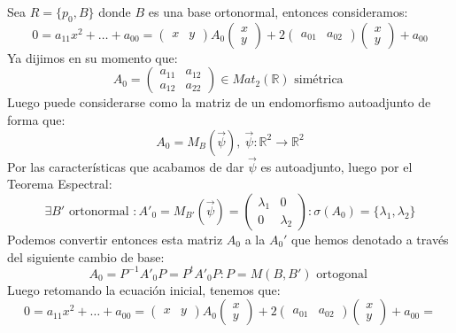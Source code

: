 \documentclass[10pt,a4paper,openright]{book}
\begin{document}
Sea $R = \{p_0, B\}$ donde $B$ es una base ortonormal, entonces consideramos:
$$0 = a_{11}x^2 + \ldots + a_{00} = \begin{pmatrix} x & y \end{pmatrix} A_0 \begin{pmatrix} x \\ y \end{pmatrix} + 2 \begin{pmatrix} a_{01} & a_{02} \end{pmatrix} \begin{pmatrix} x \\ y \end{pmatrix} + a_{00}$$
Ya dijimos en su momento que:
$$A_0 = \begin{pmatrix}
a_{11} & a_{12} \\ a_{12} & a_{22}
\end{pmatrix} \in Mat_2 (\mathbb{R}) \mbox{ simétrica }$$
Luego puede considerarse como la matriz de un endomorfismo autoadjunto de forma que:
$$A_0 = M_B (\vec{\psi}), \ \vec{\psi} : \mathbb{R}^2 \to \mathbb{R}^2$$
Por las características que acabamos de dar $\vec{\psi}$ es autoadjunto, luego por el Teorema Espectral:
$$\exists B' \mbox{ ortonormal }: A'_0 = M_{B'} (\vec{\psi}) = \begin{pmatrix} \lambda_1 & 0 \\ 0 & \lambda_2 \end{pmatrix}:  \sigma(A_0) = \{\lambda_1, \lambda_2\}$$
Podemos convertir entonces esta matriz $A_0$ a la $A_0'$ que hemos denotado a través del siguiente cambio de base:
$$A_0 = P^{-1} A'_0 P = P^t A'_0 P : P = M(B, B') \mbox{ ortogonal }$$
Luego retomando la ecuación inicial, tenemos que:
$$0 = a_{11}x^2 + \ldots + a_{00} = \begin{pmatrix} x & y \end{pmatrix} A_0 \begin{pmatrix} x \\ y \end{pmatrix} + 2 \begin{pmatrix} a_{01} & a_{02} \end{pmatrix} \begin{pmatrix} x \\ y \end{pmatrix} + a_{00} =$$
\end{document}
